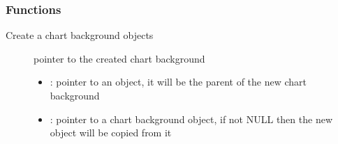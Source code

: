 \documentclass[letterpaper,10pt,english]{sphinxmanual}
\begin{document}

\begin{fulllineitems}
\label{\detokenize{object-types/chart:_CPPv4Ut7_anon_51}}%
\pysigstartmultiline
{}%
\pysigstopmultiline
{}

\begin{fulllineitems}
\label{\detokenize{object-types/chart:_CPPv419LV_CHART_STYLE_MAIN}}%
\pysigstartmultiline
{}%
\pysigstopmultiline
\end{fulllineitems}


\end{fulllineitems}

\subsubsection*{Functions}

\begin{fulllineitems}
\label{\detokenize{object-types/chart:_CPPv415lv_chart_createP8lv_obj_tPK8lv_obj_t}}%
\pysigstartmultiline
{}\label{\detokenize{object-types/chart:lv__chart_8h_1a00212c5e9d51a8c06dd3f29b7b8ff9ae}}%
\pysigstopmultiline
Create a chart background objects \begin{description}
\item[{}] \leavevmode
pointer to the created chart background 

\item[{}] \leavevmode\begin{itemize}
\item {} 
: pointer to an object, it will be the parent of the new chart background 

\item {} 
: pointer to a chart background object, if not NULL then the new object will be copied from it 

\end{itemize}

\end{description}


\end{fulllineitems}
\end{document}
